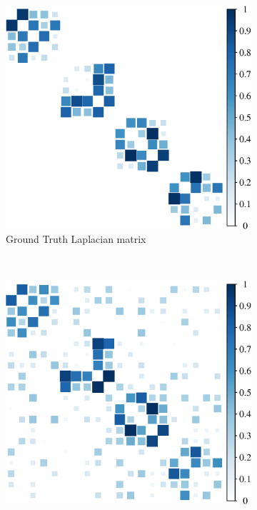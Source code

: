 \begin{figure}[!htb]
    \centering
    \begin{subfigure}[b]{0.3\textwidth}
        \includegraphics[width=\textwidth]{block-diagonal/true_mat.eps}
        \caption{Ground Truth Laplacian matrix}
    \end{subfigure}
    ~ %
    \begin{subfigure}[b]{0.3\textwidth}
        \includegraphics[width=\textwidth]{block-diagonal/noisy_mat.eps}

\end{subfigure}
\end{figure}
